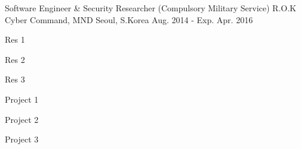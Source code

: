 \begin{cventries}
\cventry
    {Software Engineer \& Security Researcher (Compulsory Military Service)}
    {R.O.K Cyber Command, MND}
    {Seoul, S.Korea}
    {Aug. 2014 - Exp. Apr. 2016}
    {
      \begin{cvitems}[Responsibilities:]
        \item {Res 1}
        \item {Res 2}
        \item {Res 3}
      \end{cvitems}
    }
    {
      \begin{cvitems}[Projects:]
        \item { Project 1 }
        \item { Project 2 }
        \item { Project 3 }
      \end{cvitems}
    }
\end{cventries}
